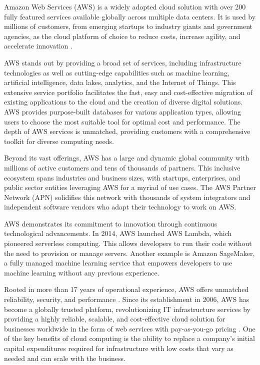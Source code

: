Amazon Web Services (AWS) is a widely adopted cloud solution with over 200 fully featured services available globally across multiple data centers. It is used by millions of customers, from emerging startups to industry giants and government agencies, as the cloud platform of choice to reduce costs, increase agility, and accelerate innovation \cite{EuAmazonWebServices}.

AWS stands out by providing a broad set of services, including infrastructure technologies as well as cutting-edge capabilities such as machine learning, artificial intelligence, data lakes, analytics, and the Internet of Things. This extensive service portfolio facilitates the fast, easy and cost-effective migration of existing applications to the cloud and the creation of diverse digital solutions. AWS provides purpose-built databases for various application types, allowing users to choose the most suitable tool for optimal cost and performance. The depth of AWS services is unmatched, providing customers with a comprehensive toolkit for diverse computing needs.

Beyond its vast offerings, AWS has a large and dynamic global community with millions of active customers and tens of thousands of partners. This inclusive ecosystem spans industries and business sizes, with startups, enterprises, and public sector entities leveraging AWS for a myriad of use cases. The AWS Partner Network (APN) solidifies this network with thousands of system integrators and independent software vendors who adapt their technology to work on AWS.

AWS demonstrates its commitment to innovation through continuous technological advancements. In 2014, AWS launched AWS Lambda, which pioneered serverless computing. This allows developers to run their code without the need to provision or manage servers. Another example is Amazon SageMaker, a fully managed machine learning service that empowers developers to use machine learning without any previous experience.

Rooted in more than 17 years of operational experience, AWS offers unmatched reliability, security, and performance \cite{WhatIsAWS}. Since its establishment in 2006, AWS has become a globally trusted platform, revolutionizing IT infrastructure services by providing a highly reliable, scalable, and cost-effective cloud solution for businesses worldwide in the form of web services with pay-as-you-go pricing \cite{AboutAWS}. One of the key benefits of cloud computing is the ability to replace a company's initial capital expenditures required for infrastructure with low costs that vary as needed and can scale with the business.

